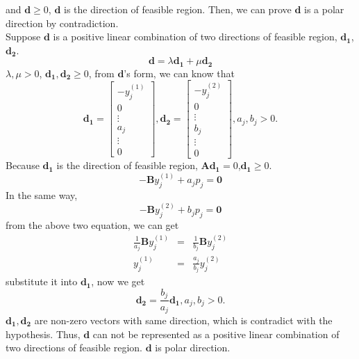 \documentclass[paper=a4, fontsize=11pt]{scrartcl} %
\numberwithin{equation}{section} %
\numberwithin{figure}{section} %
\numberwithin{table}{section} %
\begin{document}
and $\mathbf{d}\geq0$, $\mathbf{d}$ is the direction of feasible region. Then, we can prove $\mathbf{d}$ is a polar direction by contradiction.\\
Suppose $\mathbf{d}$ is a positive linear combination of two directions of feasible region, $\mathbf{d_1}$, $\mathbf{d_2}$.
\begin{equation}
\mathbf{d} = \lambda\mathbf{d_1}+\mu\mathbf{d_2}
\end{equation}
$\lambda,\mu>0$, $\mathbf{d_1},\mathbf{d_2}\geq0$, from $\mathbf{d}$'s form, we can know that
\begin{equation}  \nonumber
\mathbf{d_1} = \begin{bmatrix}-y^{(1)}_{j} \\  0 \\ \vdots \\ a_j \\ \vdots \\ 0 \end{bmatrix},
\mathbf{d_2} = \begin{bmatrix}-y^{(2)}_{j} \\  0 \\ \vdots \\ b_j \\ \vdots \\ 0 \end{bmatrix}, a_j, b_j>0.
\end{equation}
Because $\mathbf{d_1}$ is the direction of feasible region, $\mathbf{Ad_1}=0$,$\mathbf{d_1}\geq0$.
\begin{equation}
-\mathbf{B}y^{(1)}_{j}+a_jp_j = \mathbf{0}
\end{equation}
In the same way,
\begin{equation}
-\mathbf{B}y^{(2)}_{j}+b_jp_j = \mathbf{0}
\end{equation}
from the above two equation, we can get
\begin{equation}
\begin{array}{rcl}
\frac{1}{a_j}\mathbf{B}y^{(1)}_{j} &=& \frac{1}{b_j}\mathbf{B}y^{(2)}_{j} \\
y^{(1)}_{j} &=& \frac{a_j}{b_j}y^{(2)}_{j}
\end{array}
\end{equation}
substitute it into $\mathbf{d_1}$, now we get
\begin{equation}
\mathbf{d_2} = \frac{b_j}{a_j}\mathbf{d_1}, a_j,b_j>0.
\end{equation}
$\mathbf{d_1}, \mathbf{d_2}$ are non-zero vectors with same direction, which is contradict with the hypothesis. Thus, $\mathbf{d}$ can not be represented as a positive linear combination of two directions of feasible region. $\mathbf{d}$ is polar direction.
\end{document}
